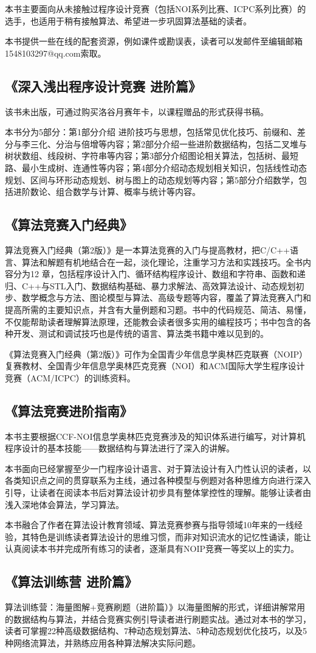 本书主要面向从未接触过程序设计竞赛（包括NOI系列比赛、ICPC系列比赛）的选手，也适用于稍有接触算法、希望进一步巩固算法基础的读者。

本书提供一些在线的配套资源，例如课件或勘误表，读者可以发邮件至编辑邮箱1548103297@qq.com索取。
\subsection*{《深入浅出程序设计竞赛 进阶篇》\md{[汪楚奇]}}
该书未出版，可通过购买洛谷月赛年卡，以课程赠品的形式获得书稿。

本书分为5部分：第1部分介绍 进阶技巧与思想，包括常见优化技巧、前缀和、差分与李三化、分治与倍增等内容；第2部分介绍一些进阶数据结构，包括二叉堆与树状数组、线段树、字符串等内容；第3部分介绍图论相关算法，包括树、最短路、最小生成树、连通性等内容；第4部分介绍动态规划相关知识，包括线性动态规划、区间与环形动态规划、树与图上的动态规划等内容；第5部分介绍数学，包括进阶数论、组合数学与计算、概率与统计等内容。

\subsection*{《算法竞赛入门经典》 \md{[刘汝佳]}}
算法竞赛入门经典（第2版）》是一本算法竞赛的入门与提高教材，把C/C++语言、算法和解题有机地结合在一起，淡化理论，注重学习方法和实践技巧。全书内容分为12 章，包括程序设计入门、循环结构程序设计、数组和字符串、函数和递归、C++与STL入门、数据结构基础、暴力求解法、高效算法设计、动态规划初步、数学概念与方法、图论模型与算法、高级专题等内容，覆盖了算法竞赛入门和提高所需的主要知识点，并含有大量例题和习题。书中的代码规范、简洁、易懂，不仅能帮助读者理解算法原理，还能教会读者很多实用的编程技巧；书中包含的各种开发、测试和调试技巧也是传统的语言、算法类书籍中难以见到的。

《算法竞赛入门经典（第2版）》可作为全国青少年信息学奥林匹克联赛（NOIP）复赛教材、全国青少年信息学奥林匹克竞赛（NOI）和ACM国际大学生程序设计竞赛（ACM/ICPC）的训练资料。
\subsection*{《算法竞赛进阶指南》 \md{[李煜东]}}


本书主要根据CCF-NOI信息学奥林匹克竞赛涉及的知识体系进行编写，对计算机程序设计的基本技能——数据结构与算法进行了深入的讲解。

本书面向已经掌握至少一门程序设计语言、对于算法设计有入门性认识的读者，以各类知识点之间的贯穿联系为主线，通过各种模型与例题对各种思维方向进行深入引导，让读者在阅读本书后对算法设计初步具有整体掌控性的理解。能够让读者由浅入深地体会算法，学习算法。

本书融合了作者在算法设计教育领域、算法竞赛参赛与指导领域10年来的一线经验，其特色是训练读者算法设计的思维习惯，而非对知识流水的记忆性诵读，能让认真阅读本书并完成所有练习的读者，逐渐具有NOIP竞赛一等奖以上的实力。

\subsection*{《算法训练营 进阶篇》\md{[陈小玉]}}
算法训练营：海量图解+竞赛刷题（进阶篇）》以海量图解的形式，详细讲解常用的数据结构与算法，并结合竞赛实例引导读者进行刷题实战。通过对本书的学习，读者可掌握22种高级数据结构、7种动态规划算法、5种动态规划优化技巧，以及5种网络流算法，并熟练应用各种算法解决实际问题。
